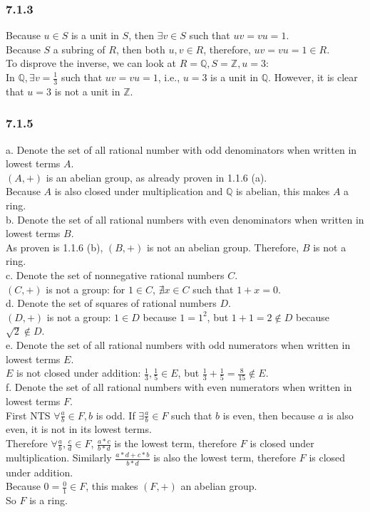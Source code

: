 \documentclass{article}
\begin{document}
\subsubsection{7.1.3}
Because $u \in S$ is a unit in $S$, then $\exists v \in S$ such that $uv = vu = 1$.\\
Because $S$ a subring of $R$, then both $u, v \in R$, therefore, $uv = vu = 1 \in R$.\\
To disprove the inverse, we can look at $R = \mathbb{Q}, S = \mathbb{Z}, u = 3$:\\
In $\mathbb{Q}, \exists v = \frac{1}{3}$ such that $uv = vu = 1$, i.e., $u = 3$ is a unit in $\mathbb{Q}$.
However, it is clear that $u = 3$ is not a unit in $\mathbb{Z}$.
\subsubsection{7.1.5}
\begin{addmargin}[1em]{0em}
a. Denote the set of all rational number with odd denominators when written in lowest terms $A$.\\
$(A,+)$ is an abelian group, as already proven in 1.1.6 (a).\\
Because $A$ is also closed under multiplication and $\mathbb{Q}$ is abelian, this makes $A$ a ring.\\
b. Denote the set of all rational numbers with even denominators when written in lowest terms $B$.\\
As proven is 1.1.6 (b), $(B,+)$ is not an abelian group. Therefore, $B$ is not a ring.\\
c. Denote the set of nonnegative rational numbers $C$.\\
$(C,+)$ is not a group: for $1 \in C$, $\nexists x \in C$ such that $1+x = 0$.\\
d. Denote the set of squares of rational numbers $D$.\\
$(D,+)$ is not a group: $1 \in D$ because $1 = 1^2$, but $1+1 = 2 \notin D$ because $\sqrt{2} \notin D$.\\
e. Denote the set of all rational numbers with odd numerators when written in lowest terms $E$.\\
$E$ is not closed under addition: $\frac{1}{3}, \frac{1}{5} \in E$, but $\frac{1}{3} + \frac{1}{5} = \frac{8}{15} \notin E$.\\
f. Denote the set of all rational numbers with even numerators when written in lowest terms $F$.\\
First NTS $\forall \frac{a}{b} \in F, b$ is odd. If $\exists \frac{a}{b} \in F$ such that $b$ is even, then because $a$ is also even, it is not in its lowest terms.\\
Therefore $\forall \frac{a}{b}, \frac{c}{d} \in F$, $\frac{a*c}{b*d}$ is the lowest term, therefore $F$ is closed under multiplication.
Similarly $\frac{a*d + c*b}{b*d}$ is also the lowest term, therefore $F$ is closed under addition.\\
Because $0 = \frac{0}{1} \in F$, this makes $(F,+)$ an abelian group.\\
So $F$ is a ring.\\
\end{addmargin}
\end{document}
